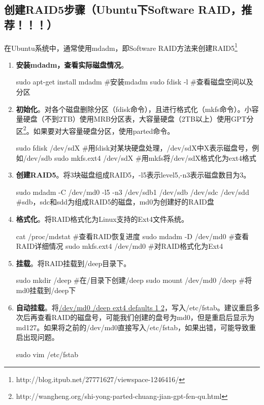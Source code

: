 \subsection{创建RAID5步骤（Ubuntu下Software RAID，推荐！！！）}
在Ubuntu系统中，通常使用mdadm，即Software RAID方法来创建RAID5\footnote{http://blog.itpub.net/27771627/viewspace-1246416/}
\begin{enumerate}
\item \textbf{安装mdadm，查看实际磁盘情况}。
\begin{bash}
sudo apt-get install mdadm	 #安装mdadm
sudo fdisk -l			 #查看磁盘空间以及分区
\end{bash}

\item \textbf{初始化}。对各个磁盘删除分区（fdisk命令），且进行格式化（mkfs命令）。小容量硬盘（不到2TB）使用MRB分区表，大容量硬盘（2TB以上）使用GPT分区\footnote{http://wangheng.org/shi-yong-parted-chuang-jian-gpt-fen-qu.html}。如果要对大容量硬盘分区，使用parted命令。
\begin{bash}
sudo fdisk /dev/sdX  		 #用fdisk对某块硬盘处理，/dev/sdX中X表示磁盘号，例如/dev/sdb
sudo mkfs.ext4 /dev/sdX   	 #用mkfs将/dev/sdX格式化为ext4格式
\end{bash}

\item \textbf{创建RAID5}。将3块磁盘组成RAID5，-l5表示level5,-n3表示磁盘数目为3。
\begin{bash}
sudo mdadm -C /dev/md0 -l5 -n3 /dev/sdb1 /dev/sdb /dev/sdc /dev/sdd   #sdb，sdc和sdd为组成RAID5的磁盘，md0为创建好的RAID盘
\end{bash}

\item \textbf{格式化}。将RAID格式化为Linux支持的Ext4文件系统。
\begin{bash}
cat /proc/mdstat		#查看RAID恢复进度
sudo mdadm -D /dev/md0 		#查看RAID详细情况
sudo mkfs.ext4 /dev/md0 	#对RAID格式化为Ext4
\end{bash} 

\item \textbf{挂载}。将RAID挂载到/deep目录下。
\begin{bash}
sudo mkdir /deep		#在/目录下创建/deep
sudo mount /dev/md0 /deep  	#将md0挂载到/deep下
\end{bash} 

\item \textbf{自动挂载}。将\underline{/dev/md0 /deep ext4 defaults 1 2}，写入/etc/fstab。建议重启多次后再查看RAID的磁盘号，可能我们创建的盘号为md0，但是重启后显示为md127。如果将之前的/dev/md0直接写入/etc/fstab，如果出错，可能导致重启出现问题。
\begin{bash}
sudo vim /etc/fstab 
\end{bash}
\end{enumerate}


